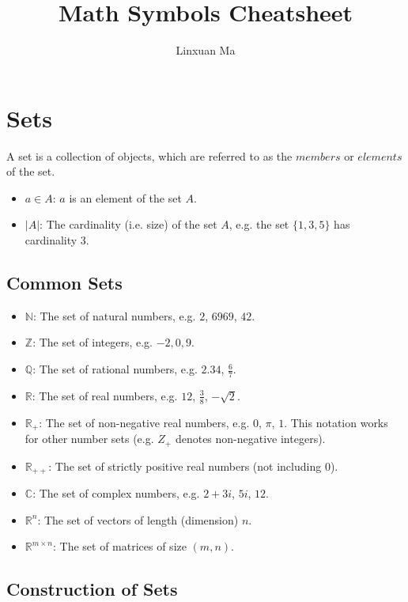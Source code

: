 \documentclass[12pt]{article}
\title{\vspace{-2.0cm}Math Symbols Cheatsheet}
\author{Linxuan Ma}
\theoremstyle{definition}
\newcommand{\RR}{\mathbb{R}}
\newcommand{\NN}{\mathbb{N}}
\newcommand{\CC}{\mathbb{C}}
\newcommand{\bras}[1]{\lbrace #1 \rbrace}
\begin{document}
	\maketitle
	
	\section{Sets}
	
	A set is a collection of objects, which are referred to as the $members$ or $elements$ of the set.
	
	\begin{itemize}
		\item $a \in A$: $a$ is an element of the set $A$.
		\item $|A|$: The cardinality (i.e. size) of the set $A$, e.g. the set $\bras{1, 3, 5}$ has cardinality $3$.
	\end{itemize}
	
	\subsection{Common Sets}
	\begin{itemize}
		\item $\NN$: The set of natural numbers, e.g. $2$, $6969$, $42$.
		\item $\mathbb{Z}$: The set of integers, e.g. $-2, 0, 9$.
		\item $\mathbb{Q}$: The set of rational numbers, e.g. $2.34$, $\frac{6}{7}$.
		\item $\RR$: The set of real numbers, e.g. $12$, $\frac{3}{8}$, $-\sqrt{2}$.
		\item $\RR_+$: The set of non-negative real numbers, e.g. $0$, $\pi$, $1$. This notation works for other number sets (e.g. $Z_+$ denotes non-negative integers).
		\item $\RR_{++}$: The set of strictly positive real numbers (not including $0$).
		\item $\CC$: The set of complex numbers, e.g. $2 + 3i$, $5i$, $12$.
		\item $\RR^n$: The set of vectors of length (dimension) $n$.
		\item $\RR^{m \times n}$: The set of matrices of size $(m, n)$.
	\end{itemize}
	
	\subsection{Construction of Sets}
	
\end{document}
